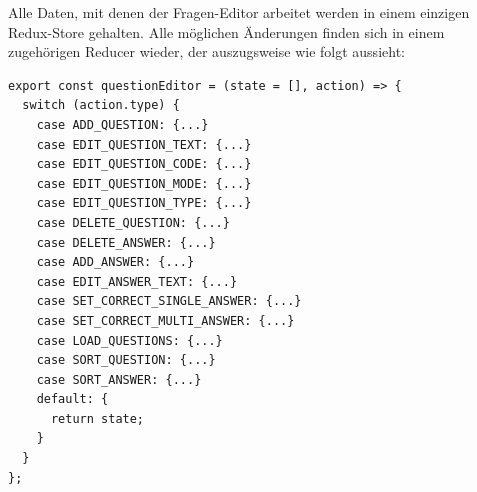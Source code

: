 Alle Daten, mit denen der Fragen-Editor arbeitet werden in einem einzigen Redux-Store gehalten. Alle möglichen Änderungen finden sich in einem zugehörigen Reducer wieder, der auszugsweise wie folgt aussieht:


\begin{minipage}{\linewidth}
\begin{lstlisting}[caption={Auszug aus dem Reducer für den Fragen-Editor (aus: src/server/reducers/questions.js)}]
export const questionEditor = (state = [], action) => {
  switch (action.type) {
    case ADD_QUESTION: {...}
    case EDIT_QUESTION_TEXT: {...}
    case EDIT_QUESTION_CODE: {...}
    case EDIT_QUESTION_MODE: {...}
    case EDIT_QUESTION_TYPE: {...}
    case DELETE_QUESTION: {...}
    case DELETE_ANSWER: {...}
    case ADD_ANSWER: {...}
    case EDIT_ANSWER_TEXT: {...}
    case SET_CORRECT_SINGLE_ANSWER: {...}
    case SET_CORRECT_MULTI_ANSWER: {...}
    case LOAD_QUESTIONS: {...}
    case SORT_QUESTION: {...}
    case SORT_ANSWER: {...}
    default: {
      return state;
    }
  }
};
\end{lstlisting}
\end{minipage}